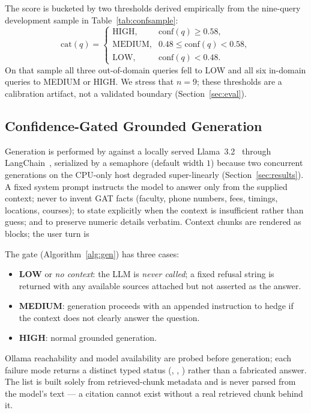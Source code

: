 The score is bucketed by two thresholds derived empirically from the
nine-query development sample in Table~\ref{tab:confsample}:
\begin{equation}
\mathrm{cat}(q) =
\begin{cases}
\text{HIGH}, & \mathrm{conf}(q) \ge 0.58,\\
\text{MEDIUM}, & 0.48 \le \mathrm{conf}(q) < 0.58,\\
\text{LOW}, & \mathrm{conf}(q) < 0.48.
\end{cases}
\label{eq:cat}
\end{equation}
On that sample all three out-of-domain queries fell to LOW and all six
in-domain queries to MEDIUM or HIGH. We stress that $n=9$; these thresholds
are a calibration artifact, not a validated boundary
(Section~\ref{sec:eval}).

\subsection{Confidence-Gated Grounded Generation}
Generation is performed by  against a locally served
Llama~3.2~\cite{grattafiori2024llama3,ollama2023} through
LangChain~\cite{langchain2022}, serialized by a semaphore (default width
$1$) because two concurrent generations on the CPU-only host degraded
super-linearly (Section~\ref{sec:results}). A fixed system prompt instructs
the model to answer only from the supplied context; never to invent GAT
facts (faculty, phone numbers, fees, timings, locations, courses); to state
explicitly when the context is insufficient rather than guess; and to
preserve numeric details verbatim. Context chunks are rendered as
 blocks; the user turn is

The gate (Algorithm~\ref{alg:gen}) has three cases:
\begin{itemize}
\item \textbf{LOW} or \emph{no context}: the LLM is \emph{never called}; a
fixed refusal string is returned with any available sources attached but
not asserted as the answer.
\item \textbf{MEDIUM}: generation proceeds with an appended instruction to
hedge if the context does not clearly answer the question.
\item \textbf{HIGH}: normal grounded generation.
\end{itemize}
Ollama reachability and model availability are probed before generation;
each failure mode returns a distinct typed status
(, ,
) rather than a fabricated answer. The
 list is built solely from retrieved-chunk metadata and is
never parsed from the model's text --- a citation cannot exist without a
real retrieved chunk behind it.

